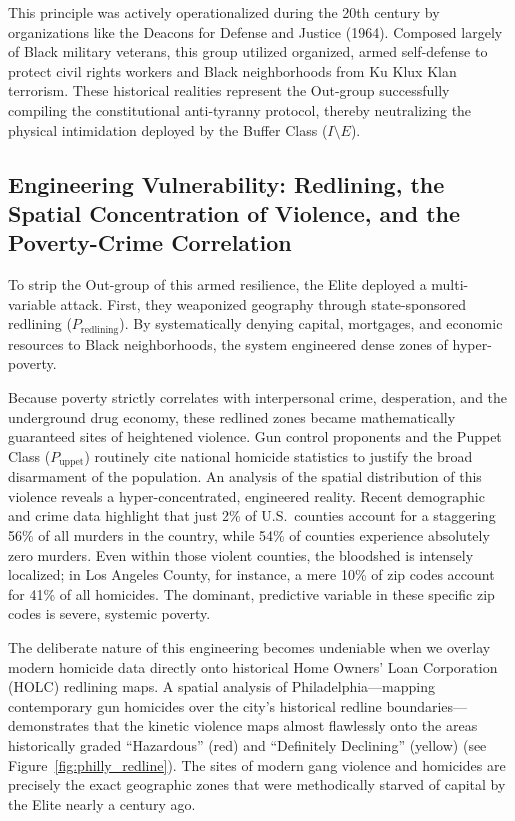 This principle was actively operationalized during the 20th century by organizations like the Deacons for Defense and Justice (1964). Composed largely of Black military veterans, this group utilized organized, armed self-defense to protect civil rights workers and Black neighborhoods from Ku Klux Klan terrorism. These historical realities represent the Out-group successfully compiling the constitutional anti-tyranny protocol, thereby neutralizing the physical intimidation deployed by the Buffer Class ($I \setminus E$).

\subsection{Engineering Vulnerability: Redlining, the Spatial Concentration of Violence, and the Poverty-Crime Correlation}

To strip the Out-group of this armed resilience, the Elite deployed a multi-variable attack. First, they weaponized geography through state-sponsored redlining ($P_{\text{redlining}}$). By systematically denying capital, mortgages, and economic resources to Black neighborhoods, the system engineered dense zones of hyper-poverty.

Because poverty strictly correlates with interpersonal crime, desperation, and the underground drug economy, these redlined zones became mathematically guaranteed sites of heightened violence. Gun control proponents and the Puppet Class ($P_{\text{uppet}}$) routinely cite national homicide statistics to justify the broad disarmament of the population. An analysis of the spatial distribution of this violence reveals a hyper-concentrated, engineered reality. Recent demographic and crime data highlight that just 2\% of U.S.\ counties account for a staggering 56\% of all murders in the country, while 54\% of counties experience absolutely zero murders. Even within those violent counties, the bloodshed is intensely localized; in Los Angeles County, for instance, a mere 10\% of zip codes account for 41\% of all homicides. The dominant, predictive variable in these specific zip codes is severe, systemic poverty.

The deliberate nature of this engineering becomes undeniable when we overlay modern homicide data directly onto historical Home Owners' Loan Corporation (HOLC) redlining maps. A spatial analysis of Philadelphia---mapping contemporary gun homicides over the city's historical redline boundaries---demonstrates that the kinetic violence maps almost flawlessly onto the areas historically graded ``Hazardous'' (red) and ``Definitely Declining'' (yellow) (see Figure~\ref{fig:philly_redline}). The sites of modern gang violence and homicides are precisely the exact geographic zones that were methodically starved of capital by the Elite nearly a century ago.

